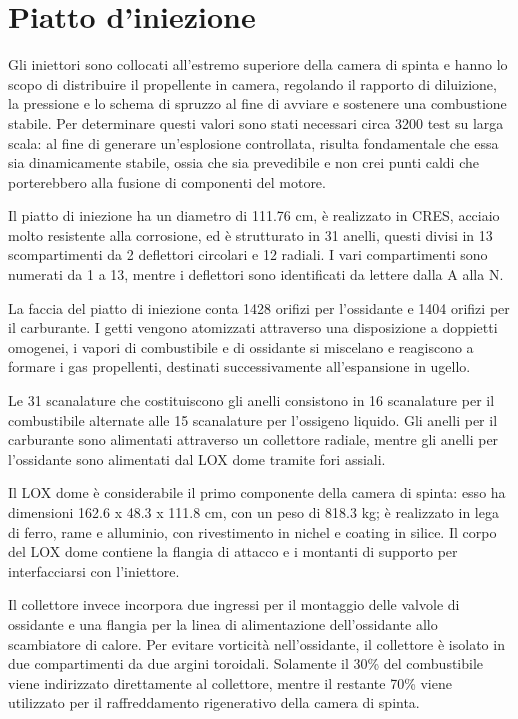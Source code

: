 \section{Piatto d'iniezione}
\label{sec:piatto iniezione}


Gli iniettori sono collocati all’estremo superiore della camera di spinta e hanno lo scopo di distribuire il propellente in camera, regolando il rapporto di diluizione, la pressione e lo schema di spruzzo al fine di avviare e sostenere una combustione stabile. Per determinare questi valori sono stati necessari circa 3200 test su larga scala: al fine di generare un’esplosione controllata, risulta fondamentale che essa sia dinamicamente stabile, ossia che sia prevedibile e non crei punti caldi che porterebbero alla fusione di componenti del motore.

Il piatto di iniezione ha un diametro di 111.76 cm, è realizzato in CRES, acciaio molto resistente alla corrosione, ed è strutturato in 31 anelli, questi divisi in 13 scompartimenti da 2 deflettori circolari e 12 radiali. I vari compartimenti sono numerati da 1 a 13, mentre i deflettori sono identificati da lettere dalla A alla N.

La faccia del piatto di iniezione conta 1428 orifizi per l’ossidante e 1404 orifizi per il carburante. I getti vengono atomizzati attraverso una disposizione a doppietti omogenei, i vapori di combustibile e di ossidante si miscelano e reagiscono a formare i gas propellenti, destinati successivamente all’espansione in ugello.

Le 31 scanalature che costituiscono gli anelli consistono in 16 scanalature per il combustibile alternate alle 15 scanalature per l’ossigeno liquido. Gli anelli per il carburante sono alimentati attraverso un collettore radiale, mentre gli anelli per l’ossidante sono alimentati dal LOX dome tramite fori assiali.

Il LOX dome è considerabile il primo componente della camera di spinta: esso ha dimensioni 162.6 x 48.3 x 111.8 cm, con un peso di 818.3 kg; è realizzato in lega di ferro, rame e alluminio, con rivestimento in nichel e coating in silice. Il corpo del LOX dome contiene la flangia di attacco e i montanti di supporto per interfacciarsi con l’iniettore.

Il collettore invece incorpora due ingressi per il montaggio delle valvole di ossidante e una flangia per la linea di alimentazione dell’ossidante allo scambiatore di calore. Per evitare vorticità nell’ossidante, il collettore è isolato in due compartimenti da due argini toroidali. Solamente il 30\% del combustibile viene indirizzato direttamente al collettore, mentre il restante 70\% viene utilizzato per il raffreddamento rigenerativo della camera di spinta.

